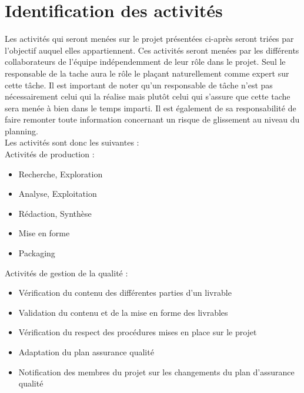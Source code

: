 \section{Identification des activités}

Les activités qui seront menées sur le projet présentées ci-après seront triées par l’objectif auquel elles appartiennent. Ces activités seront menées par les différents collaborateurs de l’équipe indépendemment    de leur rôle dans le projet. Seul le responsable de la tache aura le rôle le plaçant naturellement comme expert sur cette tâche. Il est important de noter qu’un responsable de tâche n’est pas nécessairement celui qui la réalise mais plutôt celui qui s’assure que cette tache sera menée à bien dans le temps imparti. Il est également de sa responsabilité de faire remonter toute information concernant un risque de glissement au niveau du planning. \\
  
Les activités sont donc les suivantes :\\

Activités de production : \\

\begin{itemize}
    \item[\textbullet] Recherche, Exploration
    \item[\textbullet] Analyse, Exploitation
    \item[\textbullet] Rédaction, Synthèse
    \item[\textbullet] Mise en forme
    \item[\textbullet] Packaging \\
\end{itemize}

Activités de gestion de la qualité : \\

\begin{itemize}
    \item[\textbullet] Vérification du contenu des différentes parties d’un livrable
    \item[\textbullet] Validation du contenu et de la mise en forme des livrables
    \item[\textbullet] Vérification du respect des procédures mises en place sur le projet
    \item[\textbullet] Adaptation du plan assurance qualité
    \item[\textbullet] Notification des membres du projet sur les changements du plan d’assurance qualité \\
\end{itemize}

